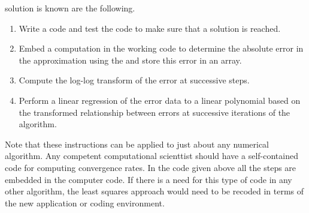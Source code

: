 \documentclass[10pt,fleqn]{article}
\begin{document}
solution is known are the following.
\begin{enumerate}
  \item Write a code and test the code to make sure that a solution is reached.
  \item Embed a computation in the working code to determine the absolute error
        in the approximation using the and store this error in an array.
  \item Compute the log-log transform of the error at successive steps.
  \item Perform a linear regression of the error data to a linear polynomial
        based on the transformed relationship between errors at successive
        iterations of the algorithm.
\end{enumerate}
Note that these instructions can be applied to just about any numerical
algorithm. Any competent computational scienttist should have a self-contained
code for computing convergence rates. In the code given above all the steps are
embedded in the computer code. If there is a need for this type of code in any
other algorithm, the least squares approach would need to be recoded in terms
of the new application or coding environment.
\end{document}
